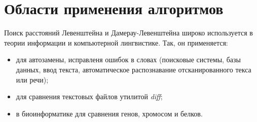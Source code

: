\section{Области применения алгоритмов}

Поиск расстояний Левенштейна и Дамерау-Левенштейна широко используется в теории
информации и компьютерной лингвистике. Так, он применяется:
\begin{itemize}
    \item для автозамены, исправленя ошибок в словах (поисковые системы, базы
          данных, ввод текста, автоматическое распознавание отсканированного
          текса или речи);
    \item для сравнения текстовых файлов утилитой \textit{diff};
    \item в биоинформатике для сравнения генов, хромосом и белков.
\end{itemize}
